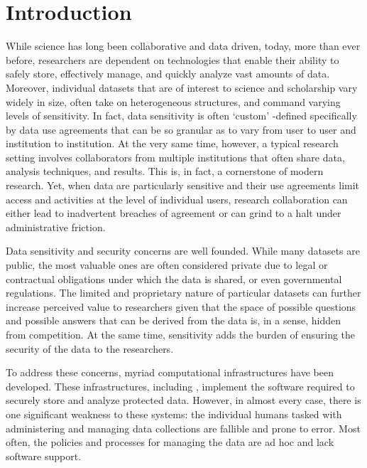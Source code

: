 \section{Introduction}



While science has long been collaborative and data driven, today, more than ever before,
researchers are dependent on technologies that enable their ability to safely store,
effectively manage, and quickly analyze vast amounts of
data. Moreover, individual datasets that are of interest to science and scholarship
vary widely in size, often take on heterogeneous structures, and command varying
levels of sensitivity. In fact, data sensitivity is often `custom' -defined specifically by
data use agreements that can be so granular as to vary from user to user and institution
to institution. At the very same time, however, a typical research setting involves
collaborators from multiple institutions that often share data, analysis techniques,
and results. This is, in fact, a cornerstone of modern research. Yet, when data are
particularly sensitive and their use agreements limit access and activities at the
level of individual users, research collaboration can either lead to inadvertent
breaches of agreement or can grind to a halt under administrative friction.


Data sensitivity and security concerns are well founded. While many datasets are public, the most
valuable ones are often considered private due to legal or contractual obligations under which the data
is shared, or even governmental regulations. The limited and proprietary nature
of particular datasets can further increase perceived value to researchers given that the space of possible
questions and possible answers that can be derived from the data is, in a sense, hidden from competition.
At the same time, sensitivity adds the burden of ensuring the security of the data to the researchers.


To address these concerns, myriad computational infrastructures
have been developed. These infrastructures, including \NAMENS \cite{babuji2016cloud},
implement the software required to securely store and analyze protected
data. However, in almost every case, there is one significant weakness to these systems: the individual humans tasked with administering and managing
data collections are fallible and prone to error. Most often, the policies and processes for managing
the data are ad hoc and lack software support.


